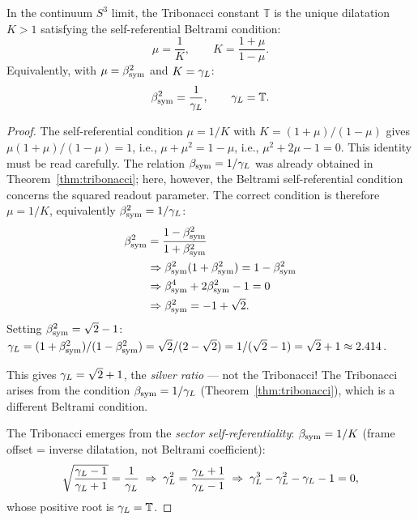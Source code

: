 \begin{theorem}
\label{thm:tribonacci-beltrami}
In the continuum $S^3$ limit, the Tribonacci constant $\mathbb{T}$
is the unique dilatation $K>1$ satisfying the self-referential
Beltrami condition:
\[
 \mu = \frac{1}{K}, \qquad K = \frac{1+\mu}{1-\mu}.
\]
Equivalently, with $\mu = \beta_{\mathrm{sym}}^2$ and $K = \gamma_L$:
\[
 \beta_{\mathrm{sym}}^2 = \frac{1}{\gamma_L},
 \qquad \gamma_L = \mathbb{T}.
\]
\end{theorem}

\begin{proof}
The self-referential condition $\mu = 1/K$ with $K = (1+\mu)/(1-\mu)$
gives $\mu(1+\mu)/(1-\mu) = 1$, i.e.,
$\mu + \mu^2 = 1 - \mu$, i.e., $\mu^2 + 2\mu - 1 = 0$.
This identity must be read carefully. The relation $\beta_{\mathrm{sym}} = 1/\gamma_L$ was already obtained in Theorem~\ref{thm:tribonacci}; here, however, the Beltrami self-referential condition concerns the squared readout parameter. The correct condition is therefore $\mu = 1/K$, equivalently $\beta_{\mathrm{sym}}^2 = 1/\gamma_L$:
\[
\begin{aligned}
\beta_{\mathrm{sym}}^2 &= \frac{1-\beta_{\mathrm{sym}}^2}{1+\beta_{\mathrm{sym}}^2}\\
&\Rightarrow \beta_{\mathrm{sym}}^2(1+\beta_{\mathrm{sym}}^2)=1-\beta_{\mathrm{sym}}^2\\
&\Rightarrow \beta_{\mathrm{sym}}^4+2\beta_{\mathrm{sym}}^2-1=0\\
&\Rightarrow \beta_{\mathrm{sym}}^2=-1+\sqrt{2}.
\end{aligned}
\]
Setting $\beta_{\mathrm{sym}}^2 = \sqrt{2}-1$: $\gamma_L = (1+\beta_{\mathrm{sym}}^2)/(1-\beta_{\mathrm{sym}}^2) = \sqrt{2}/(2-\sqrt{2}) = 1/(\sqrt{2}-1) = \sqrt{2}+1 \approx 2.414$.

This gives $\gamma_L = \sqrt{2}+1$, the \emph{silver ratio} --- not the Tribonacci!
The Tribonacci arises from the condition $\beta_{\mathrm{sym}} = 1/\gamma_L$ (Theorem~\ref{thm:tribonacci}),
which is a different Beltrami condition.

\medskip
The Tribonacci emerges from the \emph{sector self-referentiality}:
$\beta_{\mathrm{sym}} = 1/K$ (frame offset = inverse dilatation, not Beltrami coefficient):
\[
 \sqrt{\frac{\gamma_L-1}{\gamma_L+1}} = \frac{1}{\gamma_L}
 \;\Rightarrow\;
 \gamma_L^2 = \frac{\gamma_L+1}{\gamma_L-1}
 \;\Rightarrow\;
 \gamma_L^3 - \gamma_L^2 - \gamma_L - 1 = 0,
\]
whose positive root is $\gamma_L = \mathbb{T}$.
\end{proof}

